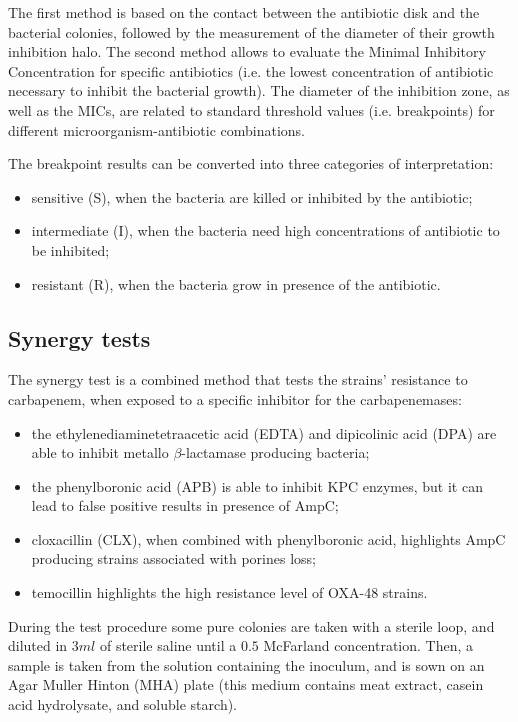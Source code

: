 \documentclass[11pt]{report}
\begin{document}
The first method is based on the contact between the antibiotic disk and the bacterial colonies, followed by the measurement of the diameter of their growth inhibition halo. 
The second method allows to evaluate the Minimal Inhibitory Concentration for specific antibiotics (i.e. the lowest concentration of antibiotic necessary to inhibit the bacterial growth).
The diameter of the inhibition zone, as well as the MICs, are related to standard threshold values (i.e. breakpoints) for different microorganism-antibiotic combinations.

The breakpoint results can be converted into three categories of interpretation:
\begin{itemize}
\item sensitive (S), when the bacteria are killed or inhibited by the antibiotic;
\item intermediate (I), when the bacteria need high concentrations of antibiotic to be inhibited;
\item resistant (R), when the bacteria grow in presence of the antibiotic.
\end{itemize}

\subsection{Synergy tests}
The synergy test is a combined method that tests the strains' resistance to carbapenem, when exposed to a specific inhibitor for the carbapenemases:
\begin{itemize}
\item the ethylenediaminetetraacetic acid (EDTA) and dipicolinic acid (DPA) are able to inhibit metallo $\beta$-lactamase producing bacteria;
\item the phenylboronic acid (APB) is able to inhibit KPC enzymes, but it can lead to false positive results in presence of AmpC;
\item cloxacillin (CLX), when combined with phenylboronic acid, highlights AmpC producing strains associated with porines loss;
\item temocillin highlights the high resistance level of OXA-48 strains.
\end{itemize}

During the test procedure some pure colonies are taken with a sterile loop, and diluted in $3ml$ of sterile saline until a $0.5$ McFarland concentration.
Then, a sample is taken from the solution containing the inoculum, and is sown on an Agar Muller Hinton (MHA) plate (this medium contains meat extract, casein acid hydrolysate, and soluble starch). 
\end{document}
